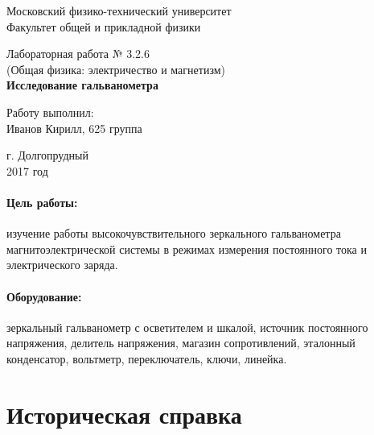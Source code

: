 \documentclass[12pt]{kiarticle}
\begin{document}
	
	\begin{titlepage}
		\begin{center}
			\large 	Московский физико-технический университет \\
			Факультет общей и прикладной физики \\
			\vspace{0.2cm}
			
			\vspace{4.5cm}
			Лабораторная работа № 3.2.6 \\ \vspace{0.2cm}
			\large (Общая физика: электричество и магнетизм) \\ \vspace{0.2cm}
			\LARGE \textbf{Исследование гальванометра}
		\end{center}
		\vspace{2.3cm} \large
		
		\begin{center}
			Работу выполнил: \\
			Иванов Кирилл,
			625 группа
			\vspace{10mm}
			
			
			
			
		\end{center}
		
		\begin{center} \vspace{60mm}
			г. Долгопрудный \\
			2017 год
		\end{center}
	\end{titlepage}
	
	
	
	
	\paragraph*{Цель работы:} изучение работы высокочувствительного зеркального гальванометра магнитоэлектрической системы в режимах измерения постоянного тока и электрического заряда.
	
	\paragraph*{Оборудование:} зеркальный гальванометр с осветителем и
	шкалой, источник постоянного напряжения, делитель напряжения, магазин сопротивлений, эталонный конденсатор, вольтметр, переключатель, ключи, линейка.
	
	
	\section{Историческая справка}
	
\end{document}
